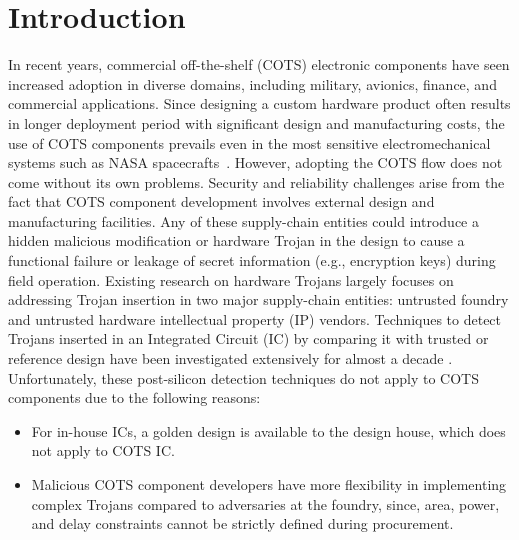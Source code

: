 \documentclass[conference]{IEEEtran}
\begin{document}
\section{Introduction}
\label{sec:intro}
\thispagestyle{empty}
In recent years, commercial off-the-shelf (COTS) electronic components have seen increased adoption in diverse domains, including military, avionics, finance, and commercial applications. Since designing a custom hardware product often results in longer deployment period with significant design and manufacturing costs, the use of COTS components prevails even in the most sensitive electromechanical systems such as NASA spacecrafts~\cite{ref:nasa}. %
However, adopting the COTS flow does not come without its own problems.
Security and reliability challenges arise from the fact that COTS component development involves external design and manufacturing facilities. Any of these supply-chain entities could introduce a hidden malicious modification or hardware Trojan in the design to cause a  functional failure or leakage of secret information (e.g., encryption keys) during field operation. 
Existing research on hardware Trojans largely focuses on addressing Trojan insertion in two major supply-chain entities: untrusted foundry and untrusted hardware intellectual property (IP) vendors. 
Techniques to detect Trojans inserted in an Integrated Circuit (IC) by comparing it with trusted or reference design have been investigated extensively for almost a decade \cite{xiao2016hardware}. Unfortunately, these post-silicon detection techniques do not apply to COTS components due to the following reasons: 
\begin{itemize}
\item For in-house ICs, a golden design is available to the design house, which does not apply to COTS IC.
\item Malicious COTS component developers have more flexibility in implementing complex Trojans compared to adversaries at the foundry, since, area, power, and delay constraints cannot be strictly defined during procurement.   
\end{itemize}
\end{document}
